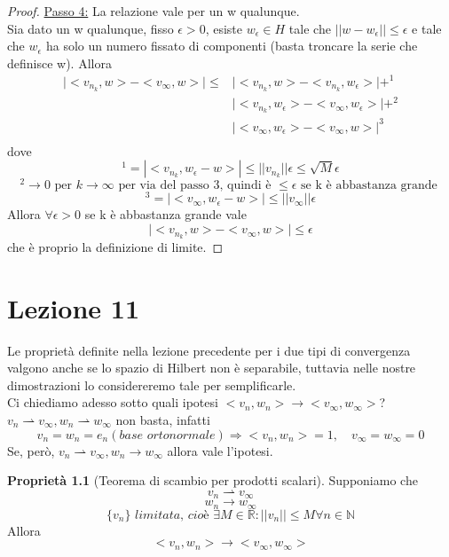 \documentclass[a4paper]{book}
\theoremstyle{definition}
\theoremstyle{remark}
\theoremstyle{definition}
\newtheorem{prop}{Proprietà}
\newcommand{\bbr}{\mathbb{R}}
\newcommand{\ra}{\Rightarrow}
\begin{document}
\begin{proof}
	\underline{Passo 4:} La relazione vale per un w qualunque.\\
	Sia dato un w qualunque, fisso $\epsilon > 0$, esiste $w_\epsilon \in H$ tale che $||w - w_\epsilon|| \le \epsilon$ e tale che $w_\epsilon$ ha solo un numero fissato di componenti (basta troncare la serie che definisce w). Allora 
	\[
	\begin{split}
		\big| <v_{n_k}, w> - <v_\infty, w> \big| \le & \big| <v_{n_k}, w>  - <v_{n_k}, w_\epsilon> \big| + ^1 \\  
		& \big| <v_{n_k}, w_\epsilon> - <v_\infty, w_\epsilon> \big| +^2 \\
		& \big| <v_\infty, w_\epsilon> - <v_\infty, w> \big| ^3 \\
	\end{split}
	\]
	dove 
	\[
	^1 = | <v_{n_k}, w_\epsilon - w > | \le ||v_{n_k}|| \epsilon \le \sqrt{M} \epsilon
	\]
	\[
	^2 \to 0 \text{ per } k \to \infty \text{ per via del passo 3, quindi è } \le \epsilon \text{ se k è abbastanza grande }
	\]
	\[
	^3 = | <v_\infty, w_\epsilon - w > | \le ||v_\infty|| \epsilon
	\]
	Allora $\forall \epsilon > 0$ se k è abbastanza grande vale
	$$
	\big| <v_{n_k}, w> - <v_\infty, w> \big| \le \epsilon
	$$
	che è proprio la definizione di limite.	
\end{proof}

\chapter{Lezione 11}
Le proprietà definite nella lezione precedente per i due tipi di convergenza valgono anche se lo spazio di Hilbert non è separabile, tuttavia nelle nostre dimostrazioni lo considereremo tale per semplificarle.
\\
Ci chiediamo adesso sotto quali ipotesi $<v_n, w_n> \to <v_\infty, w_\infty>$?
\\
$v_n \rightharpoonup v_\infty, w_n \rightharpoonup w_\infty$ non basta, infatti
$$v_n = w_n = e_n (\textit{base ortonormale}) \ra  <v_n, w_n> = 1,\quad v_\infty= w_\infty = 0$$
Se, però, $v_n \rightharpoonup v_\infty, w_n \to w_\infty$ allora vale l'ipotesi.

\begin{prop}[Teorema di scambio per prodotti scalari]
	Supponiamo che $$v_n \rightharpoonup v_\infty$$  $$w_n \to w_\infty$$ $$\{v_n\} \textit{ limitata, cioè } \exists M \in \bbr:||v_n|| \le M \forall n \in \mathbb{N}$$ 
	Allora 
	$$<v_n, w_n> \to <v_\infty, w_\infty>$$
\end{prop}
\end{document}
